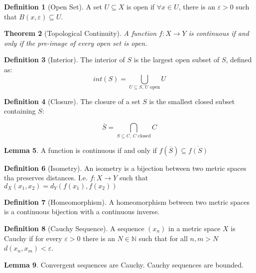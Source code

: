 \documentclass[11pt,a4paper, titlepage]{article}
\newtheorem{theorem}{Theorem}[section]
\theoremstyle{definition}
\newtheorem{definition}[theorem]{Definition}
\newtheorem{lemma}[theorem]{Lemma}
\begin{document}
\begin{definition}[Open Set]
A set $U \subseteq X$ is open if $\forall x \in U$, there is an $\varepsilon > 0$ such that $B(x, \varepsilon) \subseteq U$. 
\end{definition}

\begin{theorem}[Topological Continuity]
A function $f \colon X \longrightarrow Y$ is continuous if and only if the pre-image of every open set is open.
\end{theorem}

\begin{definition}[Interior]
The interior of $S$ is the largest open subset of $S$, defined as:
\[
	int(S) = \bigcup_{ U \subseteq S \textrm{,  } U \textrm{ open}} U
\]
\end{definition}

\begin{definition}[Closure]
The closure of a set $S$ is the smallest closed subset containing $S$:

\[
	\overline{S} = \bigcap_{S \subseteq C, \,  C\textrm{ closed}} C
\]
\end{definition}

\begin{lemma}
A function is continuous if and only if $f(\overline{S}) \subseteq \overline{f(S)}$
\end{lemma}

\begin{definition}[Isometry]
An isometry is a bijection between two metric spaces tha preserves distances. I.e. $f \colon X \longrightarrow Y$ such that $d_X(x_1,x_2) = d_Y(f(x_1), f(x_2))$
\end{definition}

\begin{definition}[Homeomorphism]
A homeomorphism between two metric spaces is a continuous bijection with a continuous inverse. 
\end{definition}

\begin{definition}[Cauchy Sequence]
A sequence $(x_n)$ in a metric space $X$ is Cauchy if for every $\varepsilon > 0$ there is an $N \in \mathbb{N}$ such that for all $n,m > N$ $d(x_n, x_m) < \varepsilon$.
\end{definition}

\begin{lemma}
Convergent sequences are Cauchy. Cauchy sequences are bounded.
\end{lemma}
\end{document}

